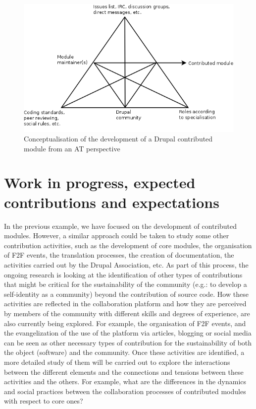\documentclass{acm_proc_article-sp}
\begin{document}
\begin{figure}
	\centering
	\includegraphics[scale=0.3]{drupal_module_at.png}
	\caption{Conceptualisation of the development of a Drupal contributed module from an AT perspective}
	\label{drupal_module_at}
\end{figure}


\section{Work in progress, expected contributions and expectations}

In the previous example, we have focused on the development of contributed modules. However, a similar approach could be taken to study some other contribution activities, such as the development of core modules, the organisation of F2F events, the translation
processes, the creation of documentation, the activities carried out by the Drupal Association, etc. As part of this process, the ongoing research is looking at the identification of other types of contributions that might be critical for the sustainability of the community (e.g.: to develop a self-identity as a community) beyond the contribution of source code. How these activities are reflected in the collaboration platform and how they are perceived by members of the community with different skills and degrees of experience, are also currently being explored. For example, the organisation of F2F events, and the evangelization of the use of the platform via articles, blogging or social media can be seen as other necessary types of contribution for the sustainability of both the object (software) and the community. Once these activities are identified, a more detailed study of them will be carried out to explore the interactions between the different elements and the connections and tensions between these activities and the others. For example, what are the differences in the dynamics and social practices between the collaboration processes of contributed modules with respect to core ones?
\end{document}
